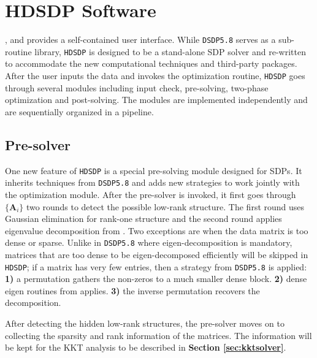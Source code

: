 \section{HDSDP Software}\label{sec5}

, and provides a
self-contained user interface. While {{\texttt{DSDP5.8}}} serves as a sub-routine library, 
{{\texttt{HDSDP}}} is designed to be a stand-alone SDP solver and re-written to accommodate the 
new computational techniques and third-party packages. After the user inputs the data and invokes the optimization routine, {{\texttt{HDSDP}}} goes through several modules
including input check, pre-solving, two-phase optimization and post-solving. The modules are implemented independently and are sequentially organized in a pipeline. 

\subsection{Pre-solver}

One new feature of {{\texttt{HDSDP}}} is a special pre-solving module
 designed for SDPs. It inherits techniques from {{\texttt{DSDP5.8}}} and adds new strategies to work jointly with the optimization module. After the pre-solver is invoked, it first goes through $\{ \mathbf{A}_i \}$ two rounds to detect the possible low-rank structure. The first round uses Gaussian elimination for rank-one structure and the
second round applies eigenvalue decomposition from . Two
exceptions are when the data matrix is too dense or sparse. Unlike in {{\texttt{DSDP5.8}}} where eigen-decomposition is mandatory, matrices that are too dense to be eigen-decomposed efficiently will be skipped in {{\texttt{HDSDP}}}; if a matrix has very few entries, then a strategy from {{\texttt{DSDP5.8}}} is applied: {\textbf{1)}} a permutation gathers the non-zeros to a much smaller dense block. {\textbf{2)}} dense eigen routines from  applies. {\textbf{3)}} the inverse permutation recovers the decomposition.

After detecting the hidden low-rank structures, the pre-solver moves on to collecting the sparsity and rank information of the matrices. The information will be kept for the KKT analysis to be described in \textbf{Section \ref{sec:kktsolver}}.

